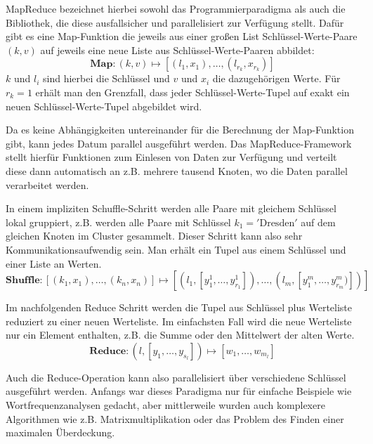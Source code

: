 MapReduce bezeichnet hierbei sowohl das Programmierparadigma als auch die Bibliothek, die diese ausfallsicher und parallelisiert zur Verfügung stellt. Dafür gibt es eine Map-Funktion die jeweils aus einer großen List Schlüssel-Werte-Paare $(k,v)$ auf jeweils eine neue Liste aus Schlüssel-Werte-Paaren abbildet:
\begin{equation}
    \mathbf{Map : }\left( k, v \right) \mapsto
    \left[ \left( l_1, x_1 \right), \ldots, \left( l_{r_k}, x_{r_k} \right) \right]
\end{equation}
$k$ und $l_i$ sind hierbei die Schlüssel und $v$ und $x_i$ die dazugehörigen Werte. Für $r_k=1$ erhält man den Grenzfall, dass jeder Schlüssel-Werte-Tupel auf exakt ein neuen Schlüssel-Werte-Tupel abgebildet wird.

Da es keine Abhängigkeiten untereinander für die Berechnung der Map-Funktion gibt, kann jedes Datum parallel ausgeführt werden. Das MapReduce-Framework stellt hierfür Funktionen zum Einlesen von Daten zur Verfügung und verteilt diese dann automatisch an z.B. mehrere tausend Knoten, wo die Daten parallel verarbeitet werden.

In einem impliziten Schuffle-Schritt werden alle Paare mit gleichem Schlüssel lokal gruppiert, z.B. werden alle Paare mit Schlüssel $k_1=\mathrm{'Dresden'}$ auf dem gleichen Knoten im Cluster gesammelt. Dieser Schritt kann also sehr Kommunikationsaufwendig sein. Man erhält ein Tupel aus einem Schlüssel und einer Liste an Werten.
\begin{equation}
    \mathbf{Shuffle :}
    \left[ \left( k_1, x_1 \right), \ldots, \left( k_n, x_n \right) \right]
    \mapsto \left[ \left( l_1, \left[ y^1_1, \ldots, y^1_{r_1} \right] \right), \ldots,
    \left( l_m, \left[ y^m_1, \ldots, y^m_{r_m}) \right] \right) \right]
\end{equation}

Im nachfolgenden Reduce Schritt werden die Tupel aus Schlüssel plus Werteliste reduziert zu einer neuen Werteliste. Im einfachsten Fall wird die neue Werteliste nur ein Element enthalten, z.B. die Summe oder den Mittelwert der alten Werte.
\begin{equation}
    \mathbf{Reduce : }
    \left( l, \left[ y_1, \ldots, y_{s_l} \right] \right)
    \mapsto \left[ w_1, \ldots, w_{m_l} \right]
\end{equation}

Auch die Reduce-Operation kann also parallelisiert über verschiedene Schlüssel ausgeführt werden.
Anfangs war dieses Paradigma nur für einfache Beispiele wie Wortfrequenzanalysen gedacht, aber mittlerweile wurden auch komplexere Algorithmen wie z.B. Matrixmultiplikation\cite{matmulmapreduce} oder das Problem des Finden einer maximalen Überdeckung\cite{maxcovermapreduce}.

